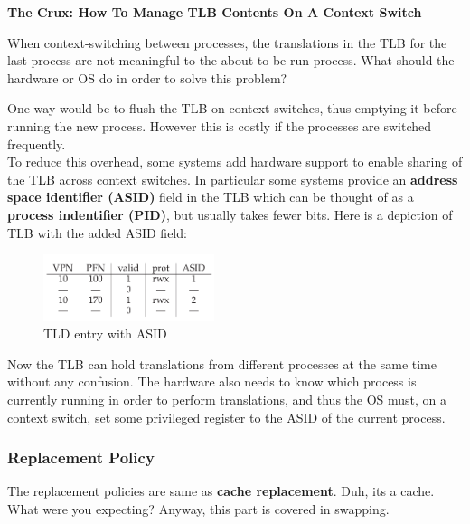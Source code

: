 \begin{tcolorbox}
    \begin{center}
        \textbf{The Crux: How To Manage TLB Contents On A Context Switch}
    \end{center}

    When context-switching between processes, the translations in the TLB
    for the last process are not meaningful to the about-to-be-run process.
    What should the hardware or OS do in order to solve this problem?
\end{tcolorbox}

One way would be to flush the TLB on context switches, thus emptying it before
running the new process. However this is costly if the processes are switched
frequently.\\

To reduce this overhead, some systems add hardware support to enable sharing of
the TLB across context switches. In particular some systems provide an
\textbf{address space identifier (ASID)} field in the TLB which can be thought
of as a \textbf{process indentifier (PID)}, but usually takes fewer bits. Here
is a depiction of TLB with the added ASID field:

\begin{figure}[h!]
    \begin{center}
        \includegraphics[width=5cm]{img/ASID.png}
        \caption{TLD entry with ASID}
    \end{center}
\end{figure}

Now the TLB can hold translations from different processes at the same time
without any confusion. The hardware also needs to know which process is
currently running in order to perform translations, and thus the OS must, on 
a context switch, set some privileged register to the ASID of the current
process.

\subsubsection{Replacement Policy}

The replacement policies are same as \textbf{cache replacement}. Duh, its a
cache. What were you expecting? Anyway, this part is covered in swapping.

